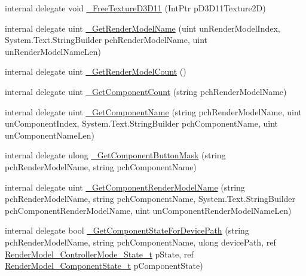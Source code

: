 \begin{DoxyCompactItemize}
internal delegate void \mbox{\hyperlink{struct_valve_1_1_v_r_1_1_i_v_r_render_models_a64addc40cba89770ceaf1e258ab4d793}{\+\_\+\+Free\+Texture\+D3\+D11}} (Int\+Ptr p\+D3\+D11\+Texture2D)
\item 
internal delegate uint \mbox{\hyperlink{struct_valve_1_1_v_r_1_1_i_v_r_render_models_a82dc27ff6d6b45e1ef3957429bf65c1e}{\+\_\+\+Get\+Render\+Model\+Name}} (uint un\+Render\+Model\+Index, System.\+Text.\+String\+Builder pch\+Render\+Model\+Name, uint un\+Render\+Model\+Name\+Len)
\item 
internal delegate uint \mbox{\hyperlink{struct_valve_1_1_v_r_1_1_i_v_r_render_models_a4957e84d66519ffebc626ccf121a607c}{\+\_\+\+Get\+Render\+Model\+Count}} ()
\item 
internal delegate uint \mbox{\hyperlink{struct_valve_1_1_v_r_1_1_i_v_r_render_models_ad3a86004136474baa0217ed18c5b8af1}{\+\_\+\+Get\+Component\+Count}} (string pch\+Render\+Model\+Name)
\item 
internal delegate uint \mbox{\hyperlink{struct_valve_1_1_v_r_1_1_i_v_r_render_models_aa62f5cca131966eaf77e1278e686d131}{\+\_\+\+Get\+Component\+Name}} (string pch\+Render\+Model\+Name, uint un\+Component\+Index, System.\+Text.\+String\+Builder pch\+Component\+Name, uint un\+Component\+Name\+Len)
\item 
internal delegate ulong \mbox{\hyperlink{struct_valve_1_1_v_r_1_1_i_v_r_render_models_a5a1b0a485a820f88672d43c1ab53cf09}{\+\_\+\+Get\+Component\+Button\+Mask}} (string pch\+Render\+Model\+Name, string pch\+Component\+Name)
\item 
internal delegate uint \mbox{\hyperlink{struct_valve_1_1_v_r_1_1_i_v_r_render_models_adda4a057b8145c45eb98857d941973dc}{\+\_\+\+Get\+Component\+Render\+Model\+Name}} (string pch\+Render\+Model\+Name, string pch\+Component\+Name, System.\+Text.\+String\+Builder pch\+Component\+Render\+Model\+Name, uint un\+Component\+Render\+Model\+Name\+Len)
\item 
internal delegate bool \mbox{\hyperlink{struct_valve_1_1_v_r_1_1_i_v_r_render_models_a3ad1b8d8db45befef29127e2c1072741}{\+\_\+\+Get\+Component\+State\+For\+Device\+Path}} (string pch\+Render\+Model\+Name, string pch\+Component\+Name, ulong device\+Path, ref \mbox{\hyperlink{struct_valve_1_1_v_r_1_1_render_model___controller_mode___state__t}{Render\+Model\+\_\+\+Controller\+Mode\+\_\+\+State\+\_\+t}} p\+State, ref \mbox{\hyperlink{struct_valve_1_1_v_r_1_1_render_model___component_state__t}{Render\+Model\+\_\+\+Component\+State\+\_\+t}} p\+Component\+State)
\item 

\end{DoxyCompactItemize}
